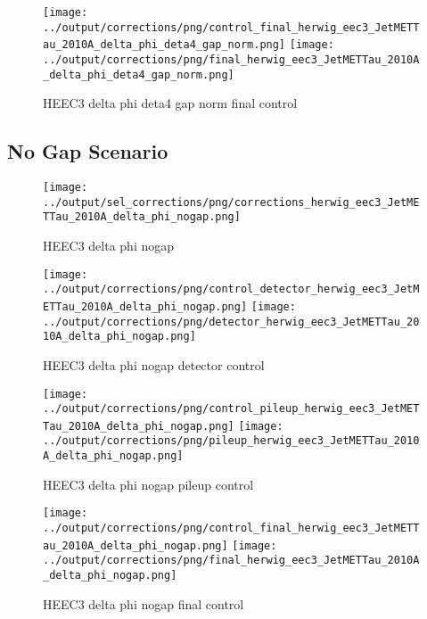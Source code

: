 \documentclass[11pt]{book}
\begin{document}
\begin{figure}[ht]
\centering
\texttt{[image: ../output/corrections/png/control\_final\_herwig\_eec3\_JetMETTau\_2010A\_delta\_phi\_deta4\_gap\_norm.png]}
\texttt{[image: ../output/corrections/png/final\_herwig\_eec3\_JetMETTau\_2010A\_delta\_phi\_deta4\_gap\_norm.png]}
\caption{HEEC3 delta phi deta4 gap norm final control}
\label{fig:HEEC3_JetMETTau_2010A_delta_phi_deta4_gap_norm_final_control}
\end{figure}

\clearpage
\subsection{No Gap Scenario}
\begin{figure}[ht]
\centering
\texttt{[image: ../output/sel\_corrections/png/corrections\_herwig\_eec3\_JetMETTau\_2010A\_delta\_phi\_nogap.png]}
\caption{HEEC3 delta phi nogap}
\label{fig:HEEC3_JetMETTau_2010A_delta_phi_nogap}
\end{figure}


\begin{figure}[ht]
\centering
\texttt{[image: ../output/corrections/png/control\_detector\_herwig\_eec3\_JetMETTau\_2010A\_delta\_phi\_nogap.png]}
\texttt{[image: ../output/corrections/png/detector\_herwig\_eec3\_JetMETTau\_2010A\_delta\_phi\_nogap.png]}
\caption{HEEC3 delta phi nogap detector control}
\label{fig:HEEC3_JetMETTau_2010A_delta_phi_nogap_detector_control}
\end{figure}

\begin{figure}[ht]
\centering
\texttt{[image: ../output/corrections/png/control\_pileup\_herwig\_eec3\_JetMETTau\_2010A\_delta\_phi\_nogap.png]}
\texttt{[image: ../output/corrections/png/pileup\_herwig\_eec3\_JetMETTau\_2010A\_delta\_phi\_nogap.png]}
\caption{HEEC3 delta phi nogap pileup control}
\label{fig:HEEC3_JetMETTau_2010A_delta_phi_nogap_pileup_control}
\end{figure}


\begin{figure}[ht]
\centering
\texttt{[image: ../output/corrections/png/control\_final\_herwig\_eec3\_JetMETTau\_2010A\_delta\_phi\_nogap.png]}
\texttt{[image: ../output/corrections/png/final\_herwig\_eec3\_JetMETTau\_2010A\_delta\_phi\_nogap.png]}
\caption{HEEC3 delta phi nogap final control}
\label{fig:HEEC3_JetMETTau_2010A_delta_phi_nogap_final_control}
\end{figure}
\end{document}
